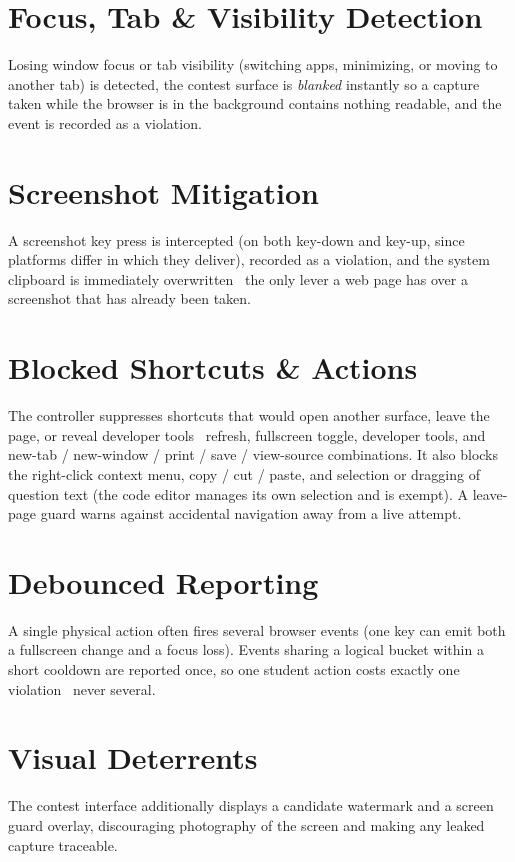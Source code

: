 \documentclass[12pt,a4paper,oneside]{report}
\begin{document}
\section{Focus, Tab \& Visibility Detection}
Losing window focus or tab visibility (switching apps, minimizing, or moving to
another tab) is detected, the contest surface is \emph{blanked} instantly so a
capture taken while the browser is in the background contains nothing readable,
and the event is recorded as a violation.

\section{Screenshot Mitigation}
A screenshot key press is intercepted (on both key-down and key-up, since
platforms differ in which they deliver), recorded as a violation, and the system
clipboard is immediately overwritten \textemdash\ the only lever a web page has
over a screenshot that has already been taken.

\section{Blocked Shortcuts \& Actions}
The controller suppresses shortcuts that would open another surface, leave the
page, or reveal developer tools \textemdash\ refresh, fullscreen toggle,
developer tools, and new-tab / new-window / print / save / view-source
combinations. It also blocks the right-click context menu, copy / cut / paste,
and selection or dragging of question text (the code editor manages its own
selection and is exempt). A leave-page guard warns against accidental navigation
away from a live attempt.

\section{Debounced Reporting}
A single physical action often fires several browser events (one key can emit
both a fullscreen change and a focus loss). Events sharing a logical bucket
within a short cooldown are reported once, so one student action costs exactly one
violation \textemdash\ never several.

\section{Visual Deterrents}
The contest interface additionally displays a candidate watermark and a screen
guard overlay, discouraging photography of the screen and making any leaked
capture traceable.
\end{document}
